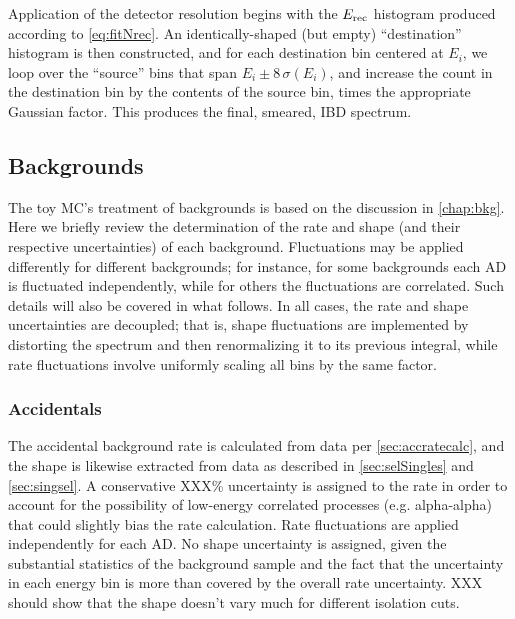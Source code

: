 \documentclass[../thesis.tex]{subfiles}
\begin{document}
Application of the detector resolution begins with the $E_\mathrm{rec}$ histogram produced according to \autoref{eq:fitNrec}. An identically-shaped (but empty) ``destination'' histogram is then constructed, and for each destination bin centered at $E_i$, we loop over the ``source'' bins that span $E_i \pm 8\,\sigma(E_i)$, and increase the count in the destination bin by the contents of the source bin, times the appropriate Gaussian factor. This produces the final, smeared, IBD spectrum.

\subsection{Backgrounds}
\label{sec:fitToyBackgrounds}

The toy MC's treatment of backgrounds is based on the discussion in \autoref{chap:bkg}. Here we briefly review the determination of the rate and shape (and their respective uncertainties) of each background. Fluctuations may be applied differently for different backgrounds; for instance, for some backgrounds each AD is fluctuated independently, while for others the fluctuations are correlated. Such details will also be covered in what follows. In all cases, the rate and shape uncertainties are decoupled; that is, shape fluctuations are implemented by distorting the spectrum and then renormalizing it to its previous integral, while rate fluctuations involve uniformly scaling all bins by the same factor.

\subsubsection{Accidentals}

The accidental background rate is calculated from data per \autoref{sec:accratecalc}, and the shape is likewise extracted from data as described in \autoref{sec:selSingles} and \autoref{sec:singsel}. A conservative XXX\% uncertainty is assigned to the rate in order to account for the possibility of low-energy correlated processes (e.g. alpha-alpha) that could slightly bias the rate calculation. Rate fluctuations are applied independently for each AD. No shape uncertainty is assigned, given the substantial statistics of the background sample and the fact that the uncertainty in each energy bin is more than covered by the overall rate uncertainty. XXX should show that the shape doesn't vary much for different isolation cuts.

\subsubsection{\LiHe}
\end{document}
